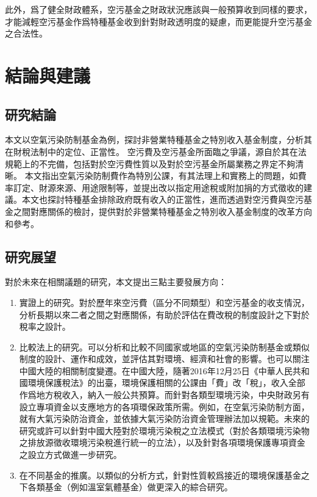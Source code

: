 \documentclass[12pt,a4paper]{article}
\begin{document}
此外，爲了健全財政體系，空污基金之財政狀況應該與一般預算收到同樣的要求，才能減輕空污基金作爲特種基金收到針對財政透明度的疑慮，而更能提升空污基金之合法性。

\section{結論與建議}

\subsection{研究結論}

本文以空氣污染防制基金為例，探討非營業特種基金之特別收入基金制度，分析其在財稅法制中的定位、正當性。
空污費及空污基金所面臨之爭議，源自於其在法規範上的不完備，包括對於空污費性質以及對於空污基金所屬業務之界定不夠清晰。
本文指出空氣污染防制費作為特別公課，有其法理上和實務上的問題，如費率訂定、財源來源、用途限制等，並提出改以指定用途稅或附加捐的方式徵收的建議。本文也探討特種基金排除政府既有收入的正當性，進而透過對空污費與空污基金之間對應關係的檢討，提供對於非營業特種基金之特別收入基金制度的改革方向和參考。



\subsection{研究展望}

對於未來在相關議題的研究，本文提出三點主要發展方向：
\begin{enumerate}
  \item 實證上的研究。對於歷年來空污費（區分不同類型）和空污基金的收支情況，分析長期以來二者之間之對應關係，有助於評估在費改稅的制度設計之下對於稅率之設計。
  \item 比較法上的研究。可以分析和比較不同國家或地區的空氣污染防制基金或類似制度的設計、運作和成效，並評估其對環境、經濟和社會的影響。也可以關注中國大陸的相關制度變遷。在中國大陸，隨著2016年12月25日《中華人民共和國環境保護稅法》的出臺，環境保護相關的公課由「費」改「稅」，收入全部作爲地方稅收入，納入一般公共預算。而針對各類型環境污染，中央財政另有設立專項資金以支應地方的各項環保政策所需。例如，在空氣污染防制方面，就有大氣污染防治資金，並依據大氣污染防治資金管理辦法加以規範。未來的研究或許可以針對中國大陸對於環境污染稅之立法模式（對於各類環境污染物之排放源徵收環境污染稅進行統一的立法），以及針對各項環境保護專項資金之設立方式做進一步研究。
  \item 在不同基金的推廣。以類似的分析方式，針對性質較爲接近的環境保護基金之下各類基金（例如溫室氣體基金）做更深入的綜合研究。
\end{enumerate}
\end{document}
